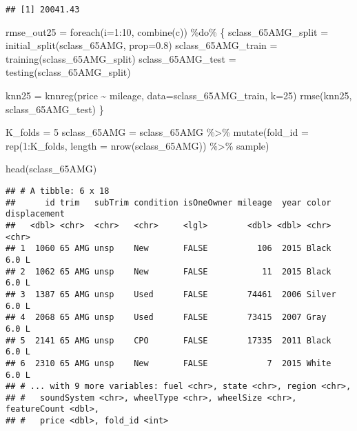\documentclass[
]{article}
\newenvironment{Shaded}{\begin{snugshade}}{\end{snugshade}}
\newcommand{\AttributeTok}[1]{\textcolor[rgb]{0.77,0.63,0.00}{#1}}
\newcommand{\DecValTok}[1]{\textcolor[rgb]{0.00,0.00,0.81}{#1}}
\newcommand{\FloatTok}[1]{\textcolor[rgb]{0.00,0.00,0.81}{#1}}
\newcommand{\FunctionTok}[1]{\textcolor[rgb]{0.00,0.00,0.00}{#1}}
\newcommand{\NormalTok}[1]{#1}
\newcommand{\OtherTok}[1]{\textcolor[rgb]{0.56,0.35,0.01}{#1}}
\newcommand{\SpecialCharTok}[1]{\textcolor[rgb]{0.00,0.00,0.00}{#1}}
\newcommand{\StringTok}[1]{\textcolor[rgb]{0.31,0.60,0.02}{#1}}
\begin{document}
\begin{verbatim}
## [1] 20041.43
\end{verbatim}

\begin{Shaded}
\begin{Highlighting}[]
\NormalTok{rmse\_out25 }\OtherTok{=} \FunctionTok{foreach}\NormalTok{(}\AttributeTok{i=}\DecValTok{1}\SpecialCharTok{:}\DecValTok{10}\NormalTok{, }\FunctionTok{combine}\NormalTok{(}\StringTok{\textquotesingle{}c\textquotesingle{}}\NormalTok{)) }\SpecialCharTok{\%do\%}\NormalTok{ \{}
\NormalTok{  sclass\_65AMG\_split }\OtherTok{=} \FunctionTok{initial\_split}\NormalTok{(sclass\_65AMG, }\AttributeTok{prop=}\FloatTok{0.8}\NormalTok{)}
\NormalTok{  sclass\_65AMG\_train }\OtherTok{=} \FunctionTok{training}\NormalTok{(sclass\_65AMG\_split)}
\NormalTok{  sclass\_65AMG\_test }\OtherTok{=} \FunctionTok{testing}\NormalTok{(sclass\_65AMG\_split)}
  
\NormalTok{  knn25 }\OtherTok{=} \FunctionTok{knnreg}\NormalTok{(price }\SpecialCharTok{\textasciitilde{}}\NormalTok{ mileage, }\AttributeTok{data=}\NormalTok{sclass\_65AMG\_train, }\AttributeTok{k=}\DecValTok{25}\NormalTok{)}
  \FunctionTok{rmse}\NormalTok{(knn25, sclass\_65AMG\_test)}
\NormalTok{\}}

\NormalTok{K\_folds }\OtherTok{=} \DecValTok{5}
\NormalTok{sclass\_65AMG }\OtherTok{=}\NormalTok{ sclass\_65AMG }\SpecialCharTok{\%\textgreater{}\%}
  \FunctionTok{mutate}\NormalTok{(}\AttributeTok{fold\_id =} \FunctionTok{rep}\NormalTok{(}\DecValTok{1}\SpecialCharTok{:}\NormalTok{K\_folds, }\AttributeTok{length =} \FunctionTok{nrow}\NormalTok{(sclass\_65AMG)) }\SpecialCharTok{\%\textgreater{}\%}\NormalTok{ sample)}

\FunctionTok{head}\NormalTok{(sclass\_65AMG)}
\end{Highlighting}
\end{Shaded}

\begin{verbatim}
## # A tibble: 6 x 18
##      id trim   subTrim condition isOneOwner mileage  year color  displacement
##   <dbl> <chr>  <chr>   <chr>     <lgl>        <dbl> <dbl> <chr>  <chr>       
## 1  1060 65 AMG unsp    New       FALSE          106  2015 Black  6.0 L       
## 2  1062 65 AMG unsp    New       FALSE           11  2015 Black  6.0 L       
## 3  1387 65 AMG unsp    Used      FALSE        74461  2006 Silver 6.0 L       
## 4  2068 65 AMG unsp    Used      FALSE        73415  2007 Gray   6.0 L       
## 5  2141 65 AMG unsp    CPO       FALSE        17335  2011 Black  6.0 L       
## 6  2310 65 AMG unsp    New       FALSE            7  2015 White  6.0 L       
## # ... with 9 more variables: fuel <chr>, state <chr>, region <chr>,
## #   soundSystem <chr>, wheelType <chr>, wheelSize <chr>, featureCount <dbl>,
## #   price <dbl>, fold_id <int>
\end{verbatim}
\end{document}
